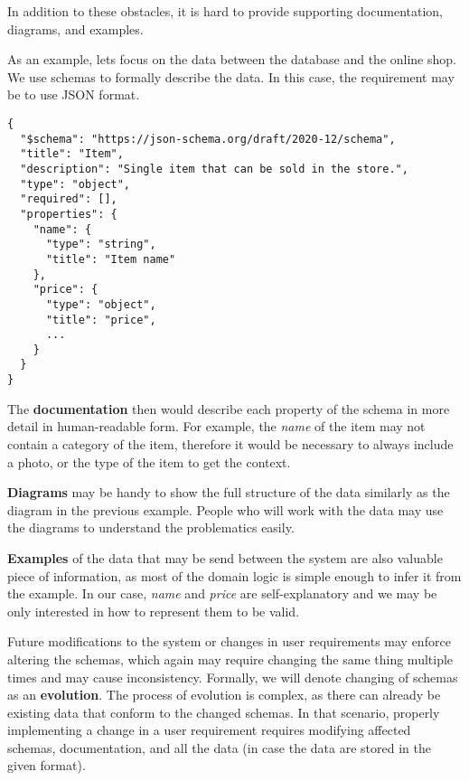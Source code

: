 In addition to these obstacles, it is hard to provide supporting documentation, diagrams, and examples.

\begin{showcase} %
As an example, lets focus on the data between the database and the online shop. We use schemas to formally describe the data. In this case, the requirement may be to use JSON format.

\begin{verbatim}
{
  "$schema": "https://json-schema.org/draft/2020-12/schema",
  "title": "Item",
  "description": "Single item that can be sold in the store.",
  "type": "object",
  "required": [],
  "properties": {
    "name": {
      "type": "string",
      "title": "Item name"
    },
    "price": {
      "type": "object",
      "title": "price",
      ...
    }
  }
}
\end{verbatim}

The \textbf{documentation} then would describe each property of the schema in more detail in human-readable form. For example, the \textit{name} of the item may not contain a category of the item, therefore it would be necessary to always include a photo, or the type of the item to get the context.

\textbf{Diagrams} may be handy to show the full structure of the data similarly as the diagram in the previous example. People who will work with the data may use the diagrams to understand the problematics easily.

\textbf{Examples} of the data that may be send between the system are also valuable piece of information, as most of the domain logic is simple enough to infer it from the example. In our case, \textit{name} and \textit{price} are self-explanatory and we may be only interested in how to represent them to be valid.
\end{showcase}

Future modifications to the system or changes in user requirements may enforce altering the schemas, which again may require changing the same thing multiple times and may cause inconsistency. Formally, we will denote changing of schemas as an \textbf{evolution}. The process of evolution is complex, as there can already be existing data that conform to the changed schemas. In that scenario, properly implementing a change in a user requirement requires modifying affected schemas, documentation, and all the data (in case the data are stored in the given format).

